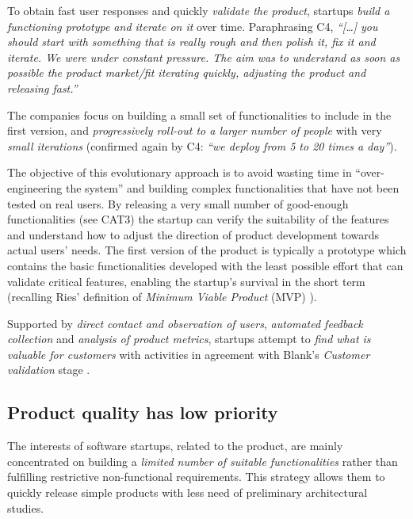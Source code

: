 \documentclass[10pt,journal,letterpaper,compsoc]{IEEEtran}
\begin{document}
To obtain fast user responses and quickly \textit{validate the product}, 
startups \textit{build a functioning prototype and iterate on it} over time. 
Paraphrasing C4, \textit{``[\ldots] you should start with something that is 
really rough and then polish it, fix it and iterate. We were under constant 
pressure. The aim was to understand as soon as possible the product market/fit 
iterating quickly, adjusting the product and releasing fast.''}

The companies focus on building a small set of functionalities to include in 
the first version, and \textit{progressively roll-out to a larger number of 
people} with very \textit{small iterations} (confirmed again by C4: \textit{``we 
deploy from 5 to 20 times a day''}).

The objective of this evolutionary approach is to avoid wasting time in 
``over-engineering the system'' and building complex functionalities that have 
not been tested on real users. By releasing a very small number of good-enough 
functionalities (see CAT3) the startup can verify the suitability of the 
features and understand how to adjust the direction of product development 
towards actual users' needs. The first version of the product is typically a 
prototype which contains the basic functionalities developed with the least 
possible effort that can validate critical features, enabling the startup's 
survival in the short term (recalling  Ries' definition of \textit{Minimum 
Viable Product} (MVP) \cite{Ries2011}).

Supported by \textit{direct contact and observation of users}, 
\textit{automated feedback collection} and \textit{analysis of product metrics}, 
startups attempt to \textit{find what is valuable for customers} with activities 
in agreement with Blank's \textit{Customer validation} stage \cite{Blank2005}.

\subsection{Product quality has low priority}
\label{res:gsm:cat3}
The interests of software startups, related to the product, are mainly 
concentrated on building a  \textit{limited number of suitable functionalities} 
rather than fulfilling restrictive non-functional requirements. This strategy 
allows them to quickly release simple products with less need of preliminary 
architectural studies.
\end{document}
